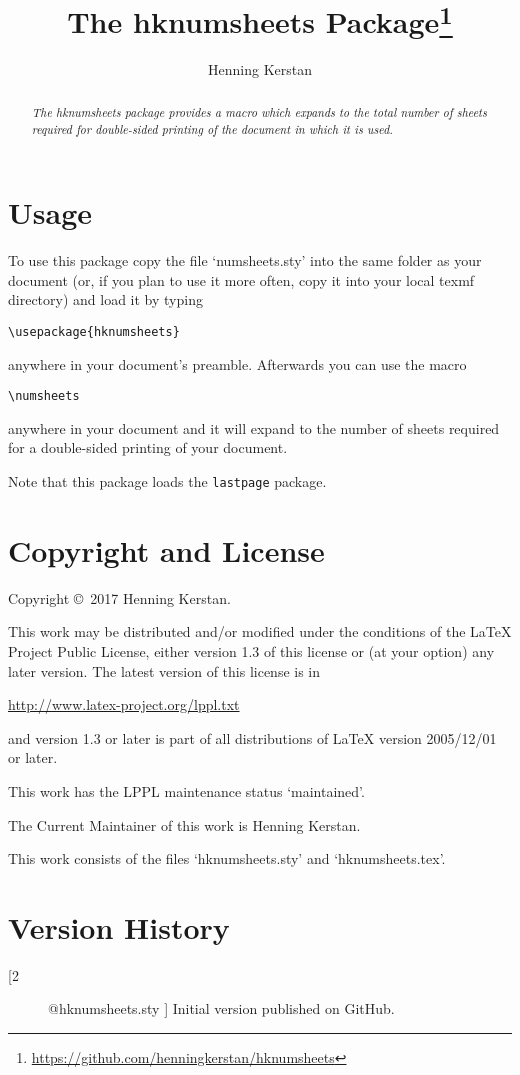 \documentclass[
  twocolumn,%
  fontsize=9pt,%
  DIV=calc,%
  numbers=noendperiod%
]{scrartcl}
\author{Henning Kerstan}
\title{%
  The hknumsheets Package\thanks{%
    \url{https://github.com/henningkerstan/hknumsheets}%
  }
}
\subtitle{\packageversion}
\date{}
\makeatletter
\newcommand{\packageversion}{\StrBefore[2]{\expandafter\csname ver@hknumsheets.sty\endcsname}{ }}
\makeatother
\begin{document}
\maketitle
\begin{abstract}
\noindent\itshape The hknumsheets package provides a macro which expands to the total number of sheets required for double-sided printing of the document in which it is used.
\end{abstract}

\section{Usage}
To use this package copy the file `numsheets.sty' into the same folder as your document (or, if you plan to use it more often, copy it into your local texmf directory) and load it by typing
\begin{lstlisting}
\usepackage{hknumsheets}
\end{lstlisting}
anywhere in your document's preamble. Afterwards you can use the macro
\begin{lstlisting}
\numsheets
\end{lstlisting}
anywhere in your document and it will expand to the number of sheets required for a double-sided printing of your document.

Note that this package loads the \texttt{lastpage} package.\newpage

\section{Copyright and License}
Copyright \copyright\ 2017 Henning Kerstan.\medskip

\noindent This work may be distributed and/or modified under the conditions of the LaTeX Project Public License, either version 1.3 of this license or (at your option) any later version. The latest version of this license is in\medskip

   \url{http://www.latex-project.org/lppl.txt}\medskip

\noindent and version 1.3 or later is part of all distributions of LaTeX version 2005/12/01 or later.\medskip

\noindent This work has the LPPL maintenance status `maintained'.\medskip

\noindent The Current Maintainer of this work is Henning Kerstan.\medskip

\noindent This work consists of the files `hknumsheets.sty' and `hknumsheets.tex'.


\section{Version History}
\begin{description}
\item[\packageversion] Initial version published on GitHub.
\end{description}
\end{document}
